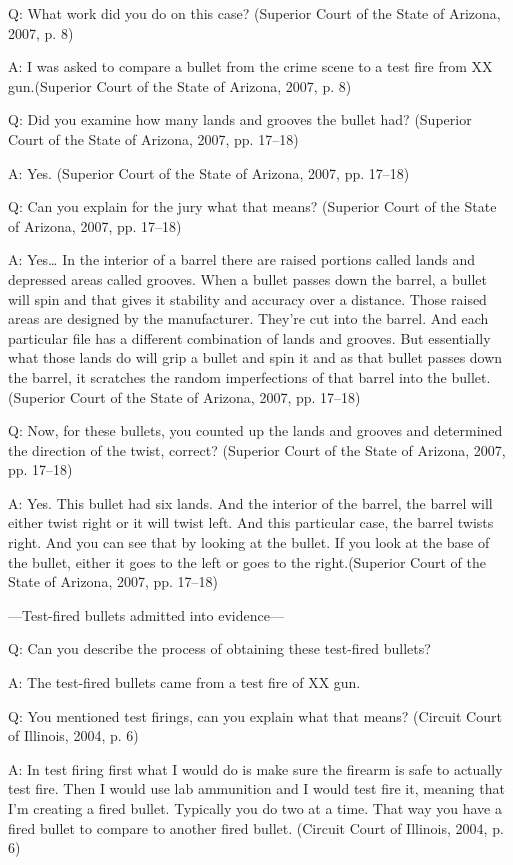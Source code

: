 \documentclass[print]{nuthesis}
\begin{document}
Q: What work did you do on this case? (Superior Court of the State of Arizona, 2007, p. 8)

A: I was asked to compare a bullet from the crime scene to a test fire from XX gun.(Superior Court of the State of Arizona, 2007, p. 8)

Q: Did you examine how many lands and grooves the bullet had? (Superior Court of the State of Arizona, 2007, pp. 17--18)

A: Yes. (Superior Court of the State of Arizona, 2007, pp. 17--18)

Q: Can you explain for the jury what that means? (Superior Court of the State of Arizona, 2007, pp. 17--18)

A: Yes\ldots{} In the interior of a barrel there are raised portions called lands and depressed areas called grooves.
When a bullet passes down the barrel, a bullet will spin and that gives it stability and accuracy over a distance.
Those raised areas are designed by the manufacturer.
They're cut into the barrel.
And each particular file has a different combination of lands and grooves.
But essentially what those lands do will grip a bullet and spin it and as that bullet passes down the barrel, it scratches the random imperfections of that barrel into the bullet.(Superior Court of the State of Arizona, 2007, pp. 17--18)

Q: Now, for these bullets, you counted up the lands and grooves and determined the direction of the twist, correct? (Superior Court of the State of Arizona, 2007, pp. 17--18)

A: Yes. This bullet had six lands. And the interior of the barrel, the barrel will either twist right or it will twist left.
And this particular case, the barrel twists right.
And you can see that by looking at the bullet.
If you look at the base of the bullet, either it goes to the left or goes to the right.(Superior Court of the State of Arizona, 2007, pp. 17--18)

---Test-fired bullets admitted into evidence---

Q: Can you describe the process of obtaining these test-fired bullets?

A: The test-fired bullets came from a test fire of XX gun.

Q: You mentioned test firings, can you explain what that means? (Circuit Court of Illinois, 2004, p. 6)

A: In test firing first what I would do is make sure the firearm is safe to actually test fire.
Then I would use lab ammunition and I would test fire it, meaning that I'm creating a fired bullet.
Typically you do two at a time.
That way you have a fired bullet to compare to another fired bullet. (Circuit Court of Illinois, 2004, p. 6)
\end{document}
